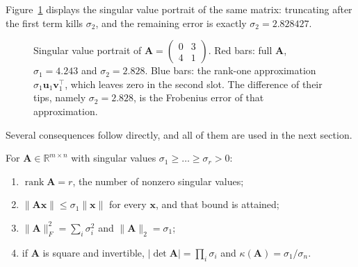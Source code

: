 Figure~\ref{fig:potret-singular} displays the singular value portrait of the same matrix:
truncating after the first term kills $\sigma_{2}$, and the remaining error is exactly
$\sigma_{2}=2.828427$.

\begin{figure}[htbp]
\centering
{}
\caption{Singular value portrait of $\mathbf{A}=\begin{pmatrix}0&3\\4&1\end{pmatrix}$.
Red bars: full $\mathbf{A}$, $\sigma_{1}=4.243$ and $\sigma_{2}=2.828$. Blue
bars: the rank-one approximation $\sigma_{1}\mathbf{u}_{1}\mathbf{v}_{1}^{\top}$, which
leaves zero in the second slot. The difference of their tips, namely $\sigma_{2}=2.828$,
is the Frobenius error of that approximation.}
\label{fig:potret-singular}
\end{figure}

Several consequences follow directly, and all of them are used in the next section.

\begin{akibat}
For $\mathbf{A}\in\mathbb{R}^{m\times n}$ with singular values
$\sigma_{1}\ge\dots\ge\sigma_{r}>0$:
\begin{enumerate}
  \item $\operatorname{rank}\mathbf{A}=r$, the number of nonzero singular values;
  \item $\|\mathbf{A}\mathbf{x}\|\le\sigma_{1}\|\mathbf{x}\|$ for every $\mathbf{x}$,
        and that bound is attained;
  \item $\|\mathbf{A}\|_{F}^{2}=\sum_{i}\sigma_{i}^{2}$ and
        $\|\mathbf{A}\|_{2}=\sigma_{1}$;
  \item if $\mathbf{A}$ is square and invertible,
        $|\det\mathbf{A}|=\prod_{i}\sigma_{i}$ and
        $\kappa(\mathbf{A})=\sigma_{1}/\sigma_{n}$.
\end{enumerate}
\end{akibat}

